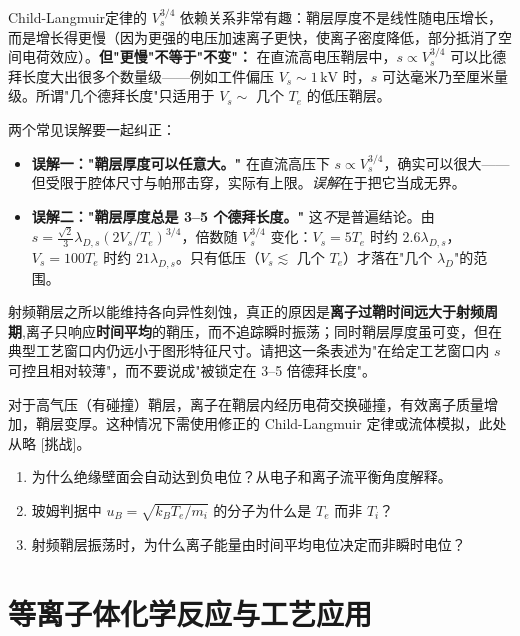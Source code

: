 \documentclass[12pt,a4paper,openany,oneside]{book}
\begin{document}
\begin{insight}{}{}
Child-Langmuir定律的 $V_s^{3/4}$ 依赖关系非常有趣：鞘层厚度不是线性随电压增长，而是增长得更慢（因为更强的电压加速离子更快，使离子密度降低，部分抵消了空间电荷效应）。\textbf{但"更慢"不等于"不变"：} 在直流高电压鞘层中，$s\propto V_s^{3/4}$ 可以比德拜长度大出很多个数量级——例如工件偏压 $V_s\sim1\,\mathrm{kV}$ 时，$s$ 可达毫米乃至厘米量级。所谓"几个德拜长度"只适用于 $V_s\sim$ 几个 $T_e$ 的低压鞘层。
\end{insight}

\begin{warning}{}{}
两个常见误解要一起纠正：
\begin{itemize}
\item \textbf{误解一："鞘层厚度可以任意大。"} 在直流高压下 $s\propto V_s^{3/4}$，确实可以很大——但受限于腔体尺寸与帕邢击穿，实际有上限。\emph{误解}在于把它当成无界。
\item \textbf{误解二："鞘层厚度总是 3--5 个德拜长度。"} 这\emph{不}是普遍结论。由 $s=\tfrac{\sqrt2}{3}\lambda_{D,s}(2V_s/T_e)^{3/4}$，倍数随 $V_s^{3/4}$ 变化：$V_s=5T_e$ 时约 $2.6\lambda_{D,s}$，$V_s=100T_e$ 时约 $21\lambda_{D,s}$。只有低压（$V_s\lesssim$ 几个 $T_e$）才落在"几个 $\lambda_D$"的范围。
\end{itemize}
射频鞘层之所以能维持各向异性刻蚀，真正的原因是\textbf{离子过鞘时间远大于射频周期},离子只响应\textbf{时间平均}的鞘压，而不追踪瞬时振荡；同时鞘层厚度虽可变，但在典型工艺窗口内仍远小于图形特征尺寸。请把这一条表述为"在给定工艺窗口内 $s$ 可控且相对较薄"，而不要说成"被锁定在 3--5 倍德拜长度"。
\end{warning}

对于高气压（有碰撞）鞘层，离子在鞘层内经历电荷交换碰撞，有效离子质量增加，鞘层变厚。这种情况下需使用修正的 Child-Langmuir 定律或流体模拟，此处从略 [挑战]。

\begin{miniquiz}
\begin{enumerate}
\item 为什么绝缘壁面会自动达到负电位？从电子和离子流平衡角度解释。
\item 玻姆判据中 $u_B = \sqrt{k_B T_e/m_i}$ 的分子为什么是 $T_e$ 而非 $T_i$？
\item 射频鞘层振荡时，为什么离子能量由时间平均电位决定而非瞬时电位？
\end{enumerate}
\end{miniquiz}

\section{等离子体化学反应与工艺应用}
\end{document}
